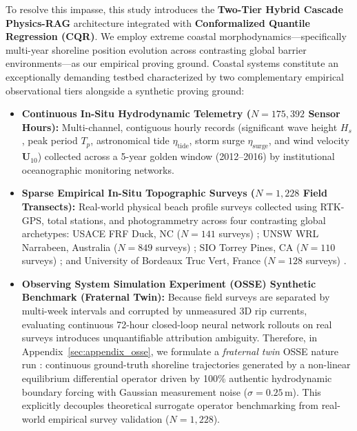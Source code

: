 \documentclass[journal]{IEEEtran}
\begin{document}
To resolve this impasse, this study introduces the \textbf{Two-Tier Hybrid Cascade Physics-RAG} architecture integrated with \textbf{Conformalized Quantile Regression (CQR)}. We employ extreme coastal morphodynamics—specifically multi-year shoreline position evolution across contrasting global barrier environments—as our empirical proving ground. Coastal systems constitute an exceptionally demanding testbed characterized by two complementary empirical observational tiers alongside a synthetic proving ground:
\begin{itemize}
    \item \textbf{Continuous In-Situ Hydrodynamic Telemetry ($N = 175{,}392$ Sensor Hours):} Multi-channel, contiguous hourly records (significant wave height $H_s$, peak period $T_p$, astronomical tide $\eta_{\text{tide}}$, storm surge $\eta_{\text{surge}}$, and wind velocity $\mathbf{U}_{10}$) collected across a 5-year golden window (2012--2016) by institutional oceanographic monitoring networks.
    \item \textbf{Sparse Empirical In-Situ Topographic Surveys ($N = 1{,}228$ Field Transects):} Real-world physical beach profile surveys collected using RTK-GPS, total stations, and photogrammetry across four contrasting global archetypes: USACE FRF Duck, NC ($N = 141$ surveys) \cite{birkemeier1985users}; UNSW WRL Narrabeen, Australia ($N = 849$ surveys) \cite{turner2016multidecade}; SIO Torrey Pines, CA ($N = 110$ surveys) \cite{ludka2015beach}; and University of Bordeaux Truc Vert, France ($N = 128$ surveys) \cite{castelle2020planshape}.
    \item \textbf{Observing System Simulation Experiment (OSSE) Synthetic Benchmark (Fraternal Twin):} Because field surveys are separated by multi-week intervals and corrupted by unmeasured 3D rip currents, evaluating continuous 72-hour closed-loop neural network rollouts on real surveys introduces unquantifiable attribution ambiguity. Therefore, in Appendix~\ref{sec:appendix_osse}, we formulate a \emph{fraternal twin} OSSE nature run \cite{atlas1997osse}: continuous ground-truth shoreline trajectories generated by a non-linear equilibrium differential operator driven by 100\% authentic hydrodynamic boundary forcing with Gaussian measurement noise ($\sigma = 0.25\,\text{m}$). This explicitly decouples theoretical surrogate operator benchmarking from real-world empirical survey validation ($N = 1{,}228$).
\end{itemize}
\end{document}
